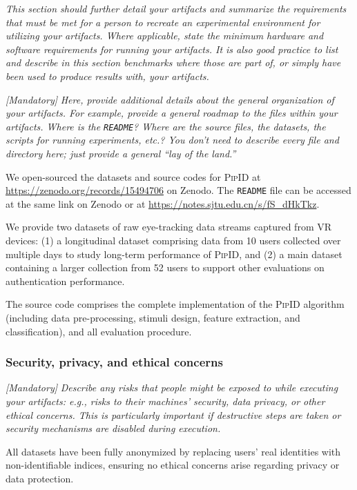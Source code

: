 \documentclass[sigconf]{acmart}
\newcommand{\sysname}{\textsc{PipID}\xspace}
\begin{document}
\emph{This section should further detail your artifacts and summarize
the requirements that must be met for a person to recreate an
experimental environment for utilizing your artifacts.  Where
applicable, state the minimum hardware and software requirements for
running your artifacts.  It is also good practice to list and describe
in this section benchmarks where those are part of, or simply have
been used to produce results with, your artifacts.}

\emph{[Mandatory]}
%
\emph{Here, provide additional details about the general organization
of your artifacts.  For example, provide a general roadmap to the
files within your artifacts.  Where is the \texttt{README}?  Where are
the source files, the datasets, the scripts for running experiments,
etc.?  You don't need to describe every file and directory here; just
provide a general ``lay of the land.''}

We open-sourced the datasets and source codes for \sysname at \url{https://zenodo.org/records/15494706} on Zenodo. The \texttt{README} file can be accessed at the same link on Zenodo or at \url{https://notes.sjtu.edu.cn/s/fS_dHkTkz}.

We provide two datasets of raw eye-tracking data streams captured from VR devices: (1) a longitudinal dataset comprising data from 10 users collected over multiple days to study long-term performance of \sysname, and (2) a main dataset containing a larger collection from 52 users to support other evaluations on authentication performance. 

The source code comprises the complete implementation of the \sysname algorithm (including data pre-processing, stimuli design, feature extraction, and classification), and all evaluation procedure. 


\subsubsection{Security, privacy, and ethical concerns}

\emph{[Mandatory]}
%
\emph{Describe any risks that people might be exposed to while
executing your artifacts: e.g., risks to their machines' security,
data privacy, or other ethical concerns.  This is particularly
important if destructive steps are taken or security mechanisms are
disabled during execution.}

All datasets have been fully anonymized by replacing users' real identities with non-identifiable indices, ensuring no ethical concerns arise regarding privacy or data protection.
\end{document}
